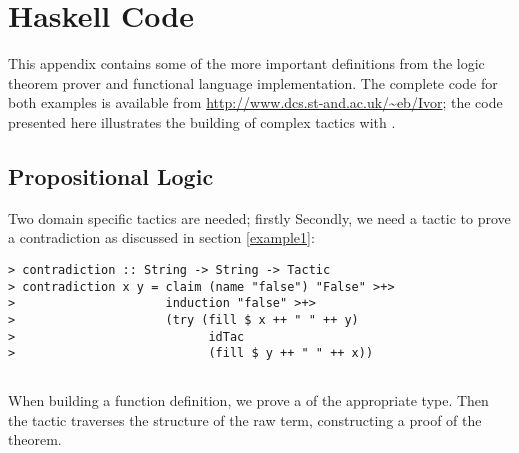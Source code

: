 \section{Haskell Code}

This appendix contains some of the more important definitions from the
logic theorem prover and functional language implementation. The
complete code for both examples is available from
\url{http://www.dcs.st-and.ac.uk/~eb/Ivor}; the code presented here
illustrates the building of complex tactics with \Ivor{}.

\subsection{Propositional Logic}

Two domain specific tactics are needed; firstly 
Secondly, we need a tactic to prove a contradiction as discussed in
section \ref{example1}:

\begin{verbatim}
> contradiction :: String -> String -> Tactic
> contradiction x y = claim (name "false") "False" >+>
>                     induction "false" >+>
>                     (try (fill $ x ++ " " ++ y)
>                           idTac
>                           (fill $ y ++ " " ++ x))
\end{verbatim}

\subsection{\Funl{}}

\label{funlapp}

When building a function definition, we prove a  of the
appropriate type. Then the  tactic traverses the
structure of the raw term, constructing a proof of the
theorem. 
